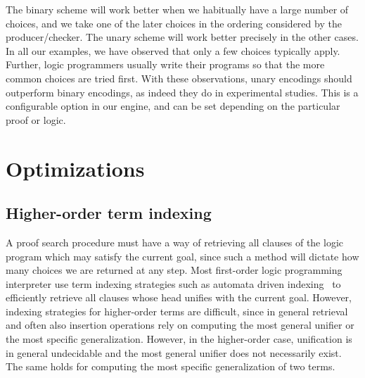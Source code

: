 \documentclass{llncs}
\begin{document}
The binary scheme will work better when we habitually have a large
number of choices, and we take one of the later choices in the
ordering considered by the producer/checker. The unary scheme will
work better precisely in the other cases. In all our examples, we have
observed that only a few choices typically apply. Further, logic
programmers usually write their programs so that the more common
choices are tried first. With these observations, unary encodings
should outperform binary encodings, as indeed they do in experimental
studies. This is a configurable option in our engine, and can be set
depending on the particular proof or logic.

\section{Optimizations}
\subsection{Higher-order term indexing}\label{sec:indexing}

A proof search procedure must have a way of retrieving all clauses of
the logic program which may satisfy the current goal, since such a
method will dictate how many choices we are returned at any step.
Most first-order logic programming interpreter use term indexing
strategies such as automata driven
indexing~\cite{Ramakrishnan01:indexing} to efficiently retrieve all
clauses whose head unifies with the current goal.  However, indexing
strategies for higher-order terms are difficult, since in general
retrieval and often also insertion operations rely on computing the
most general unifier or the most specific generalization. However, in
the higher-order case, unification is in general undecidable and the
most general unifier does not necessarily exist. The same holds for
computing the most specific generalization of two terms.
\end{document}
